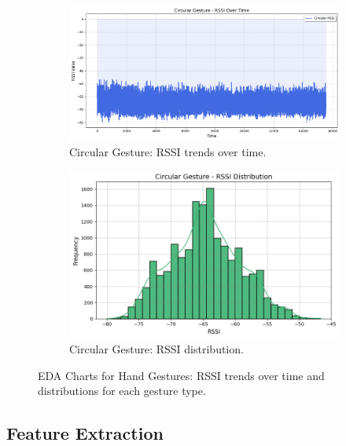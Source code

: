 \documentclass[10pt,twocolumn,letterpaper]{article}
\begin{document}
\begin{figure}[t]
  \begin{subfigure}{0.45\linewidth}
    \centering
    \includegraphics[width=\linewidth]{figures/circular_rssi_trends.png}
    \caption{Circular Gesture: RSSI trends over time.}
    \label{fig:circular_rssi_trends}
  \end{subfigure}
  \hfill
  \begin{subfigure}{0.45\linewidth}
    \centering
    \includegraphics[width=\linewidth]{figures/circular_rssi_distribution.png}
    \caption{Circular Gesture: RSSI distribution.}
    \label{fig:circular_rssi_distribution}
  \end{subfigure}

  \caption{EDA Charts for Hand Gestures: RSSI trends over time and distributions for each gesture type.}
  \label{fig:eda_charts}
  \label{fig:eda_charts}
\end{figure}




\subsection{Feature Extraction}
\end{document}
